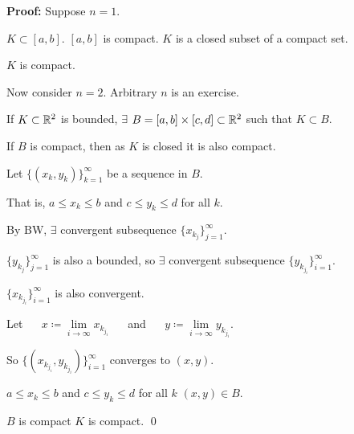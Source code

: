 \documentclass[10pt,aspectratio=169]{beamer}
\begin{document}
\begin{frame}

\textbf{Proof:}
Suppose $n=1$.

\pause
$K \subset [a,b]$.
\pause
\qquad
$[a,b]$ is compact.
\pause
\qquad
$K$ is a closed subset of a compact set.

\pause
\thus \quad $K$ is compact.

\pause
\medskip

Now consider $n=2$.
\pause
\quad
Arbitrary $n$ is an exercise.

\pause
If $K \subset {\mathbb{R}}^2$ is bounded, $\exists$
$B = [a,b]\times[c,d] \subset {\mathbb{R}}^2$ such that $K \subset B$.

\pause
If $B$ is compact, then as $K$ is closed it is also compact.

\pause
\medskip

Let $\bigl\{ (x_k,y_k) \bigr\}_{k=1}^\infty$ be a sequence in $B$.

\pause
That is, $a \leq x_k \leq b$ and $c \leq y_k \leq d$ for all $k$.

\pause
By BW, $\exists$ convergent subsequence
$\{ x_{k_j} \}_{j=1}^\infty$.

\pause
$\{ y_{k_j} \}_{j=1}^\infty$ is also a bounded, so 
$\exists$ convergent
subsequence
$\{ y_{k_{j_i}} \}_{i=1}^\infty$.

\pause
$\{ x_{k_{j_i}} \}_{i=1}^\infty$ is also convergent.

\pause
Let
~~
$x \coloneqq \lim\limits_{i\to\infty} x_{k_{j_i}}$
~~
and
~~
$y \coloneqq \lim\limits_{i\to\infty} y_{k_{j_i}}$.

\pause
\medskip

So 
$\bigl\{ (x_{k_{j_i}},y_{k_{j_i}}) \bigr\}_{i=1}^\infty$ converges to $(x,y)$.

\pause
$a \leq x_k \leq b$ and
$c \leq y_k \leq d$ for all $k$ \wthus $(x,y) \in B$.

\pause
\medskip

$B$ is compact \wthus $K$ is compact.
\qed

\end{frame}
\end{document}
